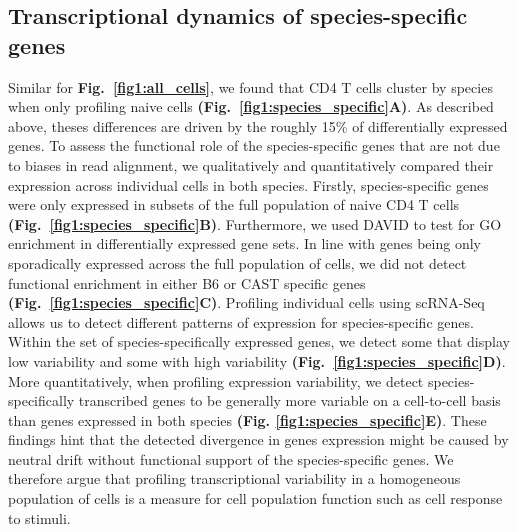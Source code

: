 \subsection{Transcriptional dynamics of species-specific genes}
\label{sec1:species-spec-dynamics}

Similar for \textbf{Fig.~\ref{fig1:all_cells}}, we found that CD4\plus{} T cells cluster by species when only profiling naive cells \textbf{(Fig.~\ref{fig1:species_specific}A)}. 
As described above, theses differences are driven by the roughly 15\% of differentially expressed genes. 
To assess the functional role of the species-specific genes that are not due to biases in read alignment, we qualitatively and quantitatively compared their expression across individual cells in both species. 
Firstly, species-specific genes were only expressed in subsets of the full population of naive CD4\plus{} T cells \textbf{(Fig.~\ref{fig1:species_specific}B)}. 
Furthermore, we used DAVID \citep{Dennis2003} to test for \gls{GO} enrichment in differentially expressed gene sets. 
In line with genes being only sporadically expressed across the full population of cells, we did not detect functional enrichment in either B6 or CAST specific genes \textbf{(Fig.~\ref{fig1:species_specific}C)}. 
Profiling individual cells using scRNA-Seq allows us to detect different patterns of expression for species-specific genes. 
Within the set of species-specifically expressed genes, we detect some that display low variability and some with high variability \textbf{(Fig.~\ref{fig1:species_specific}D)}. 
More quantitatively, when profiling expression variability, we detect species-specifically transcribed genes to be generally more variable on a cell-to-cell basis than genes expressed in both species \textbf{(Fig. \ref{fig1:species_specific}E)}. 
These findings hint that the detected divergence in genes expression might be caused by neutral drift without functional support of the species-specific genes. 
We therefore argue that profiling transcriptional variability in a homogeneous population of cells is a measure for cell population function such as cell response to stimuli.

\newpage

